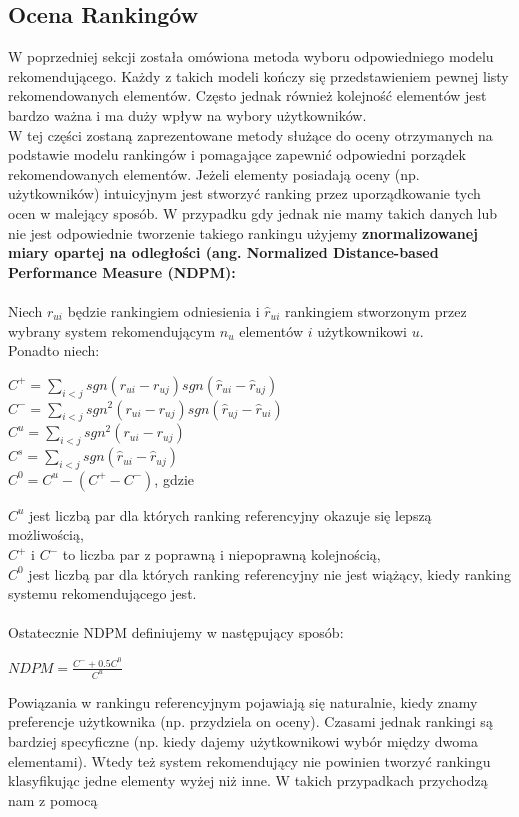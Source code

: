 \documentclass[12pt,a4paper]{report}
\begin{document}
\subsection{Ocena Rankingów}
W poprzedniej sekcji została omówiona metoda wyboru odpowiedniego modelu rekomendującego. Każdy z takich modeli kończy się przedstawieniem pewnej listy rekomendowanych elementów. Często jednak również kolejność elementów jest bardzo ważna i ma duży wpływ na wybory użytkowników.
\\W tej części zostaną zaprezentowane metody służące do oceny otrzymanych na podstawie modelu rankingów i pomagające zapewnić odpowiedni porządek rekomendowanych elementów. Jeżeli elementy posiadają oceny (np. użytkowników) intuicyjnym jest stworzyć ranking przez uporządkowanie tych ocen w malejący sposób. W przypadku gdy jednak nie mamy takich danych lub nie jest odpowiednie tworzenie takiego rankingu użyjemy \textbf{znormalizowanej miary opartej na odległości (ang. Normalized Distance-based Performance Measure (NDPM): }
\\
\\Niech $r_{ui}$ będzie rankingiem odniesienia i $\widehat{r}_{ui}$ rankingiem stworzonym przez wybrany system rekomendującym $n_u$ elementów $i$ użytkownikowi $u$. 
\\Ponadto niech:
\begin{center}
$C^{+} = \sum_{i<j} sgn(r_{ui} - r_{uj})sgn(\widehat{r}_{ui}-\widehat{r}_{uj})$
\\$C^{-} = \sum_{i<j} sgn^{2}(r_{ui} - r_{uj})sgn(\widehat{r}_{uj}-\widehat{r}_{ui})$
\\$C^{u} = \sum_{i<j} sgn^{2}(r_{ui} - r_{uj})$
\\$C^{s} = \sum_{i<j} sgn(\widehat{r}_{ui}-\widehat{r}_{uj})$
\\$C^{0}=C^{u}-(C^{+}-C^{-})$, gdzie
\end{center}
$C^{u}$ jest liczbą par dla których ranking referencyjny okazuje się lepszą możliwością, 
\\$C^{+}$ i $C^{-}$ to liczba par z poprawną i niepoprawną kolejnością,
\\$C^{0}$ jest liczbą par dla których ranking referencyjny nie jest wiążący, kiedy ranking systemu rekomendującego jest.
\\
\\Ostatecznie NDPM definiujemy w następujący sposób:
\begin{center}
$NDPM = \frac{C^{-} + 0.5 C^{0}}{C^{u}}$
\end{center}
Powiązania w rankingu referencyjnym pojawiają się naturalnie, kiedy znamy preferencje użytkownika (np. przydziela on oceny). Czasami jednak rankingi są bardziej specyficzne (np. kiedy dajemy użytkownikowi wybór między dwoma elementami). Wtedy też system rekomendujący nie powinien tworzyć rankingu klasyfikując jedne elementy wyżej niż inne. W takich przypadkach przychodzą nam z pomocą 
\end{document}
